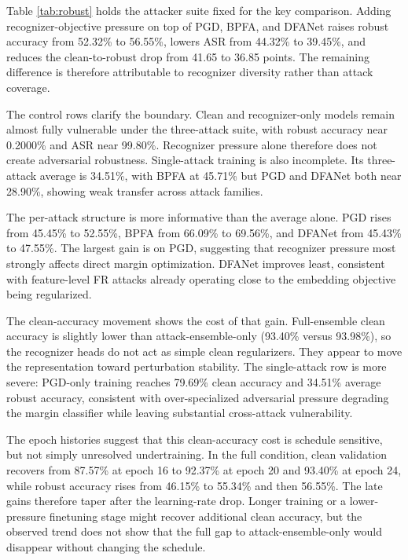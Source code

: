 \documentclass[conference]{IEEEtran}
\begin{document}
Table \ref{tab:robust} holds the attacker suite fixed for the key comparison.
Adding recognizer-objective pressure on top of PGD, BPFA, and DFANet raises
robust accuracy from 52.32\% to 56.55\%, lowers ASR from 44.32\% to 39.45\%,
and reduces the clean-to-robust drop from 41.65 to 36.85 points. The remaining
difference is therefore attributable to recognizer diversity rather than attack
coverage.

The control rows clarify the boundary. Clean and recognizer-only models remain
almost fully vulnerable under the three-attack suite, with robust accuracy near
0.2000\% and ASR near 99.80\%. Recognizer pressure alone therefore does not
create adversarial robustness. Single-attack training is also incomplete. Its
three-attack average is 34.51\%, with BPFA at 45.71\% but PGD and DFANet both
near 28.90\%, showing weak transfer across attack families.

The per-attack structure is more informative than the average alone. PGD rises
from 45.45\% to 52.55\%, BPFA from 66.09\% to 69.56\%, and DFANet from
45.43\% to 47.55\%. The largest gain is on PGD, suggesting that recognizer
pressure most strongly affects direct margin optimization. DFANet improves
least, consistent with feature-level FR attacks already operating close to the
embedding objective being regularized.

The clean-accuracy movement shows the cost of that gain. Full-ensemble clean
accuracy is slightly lower than attack-ensemble-only (93.40\% versus
93.98\%), so the recognizer heads do not act as simple clean regularizers.
They appear to move the representation toward perturbation stability. The
single-attack row is more severe: PGD-only training reaches 79.69\% clean
accuracy and 34.51\% average robust accuracy, consistent with over-specialized
adversarial pressure degrading the margin classifier while leaving substantial
cross-attack vulnerability.

The epoch histories suggest that this clean-accuracy cost is schedule
sensitive, but not simply unresolved undertraining. In the full condition,
clean validation recovers from 87.57\% at epoch 16 to 92.37\% at epoch 20 and
93.40\% at epoch 24, while robust accuracy rises from 46.15\% to 55.34\% and
then 56.55\%. The late gains therefore taper after the learning-rate drop.
Longer training or a lower-pressure finetuning stage might recover additional
clean accuracy, but the observed trend does not show that the full gap to
attack-ensemble-only would disappear without changing the schedule.
\end{document}
